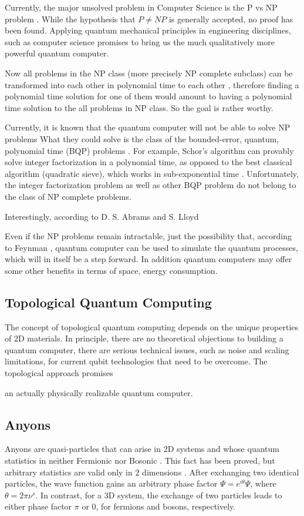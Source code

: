 Currently, the major unsolved problem in Computer Science is the P vs NP problem \cite{PvsNP}. While the hypothesis that $ P \neq NP $ is generally accepted, no proof has been found. Applying quantum mechanical principles in engineering disciplines, such as computer science \cite{FQC} promises to bring us the much qualitatively more powerful quantum computer. 

 Now all problems in the NP class (more precisely NP complete subclass) can be transformed into each other in polynomial time to each other \cite{NPComplete},  therefore finding a polynomial time solution for one of them would amount to having a polynomial time solution to the all problems in NP class. So the goal is rather worthy. 

Currently, it is known that the quantum computer will not be able to solve NP problems  What they could solve is the class of the bounded-error, quantum, polynomial time (BQP) problems \cite{BQP}. 
For example,  Schor's algorithm \cite{Schor} can provably solve integer factorization in a polynomial time, as opposed to the best classical algorithm (quadratic sieve), which works in sub-exponential time \cite{Pomerance}. Unfortunately, the integer factorization problem as well as other BQP problem do not belong to the class of NP complete problems. 

Interestingly, according to D. S. Abrams and S. Lloyd 

Even if the NP problems remain intractable, just the possibility that, according to Feynman \cite{FQC}, quantum computer can be used to simulate the quantum processes, which will in itself be a step forward. In addition quantum computers may offer some other benefits in terms of space, energy consumption. 

\subsection*{Topological Quantum Computing}
The concept of topological quantum computing \cite{Tqc1}
depends on the unique properties of 2D materials.  In principle, there are no theoretical objections to building a quantum computer, there are serious technical issues, such as noise
and scaling limitations, for current qubit technologies
that need to be overcome\cite{QCProblems}. 
The topological approach promises 

an actually physically realizable quantum computer\cite{Tqc2,Tqc3}. 


\subsection*{Anyons}
Anyons are quasi-particles that can arise in 2D systems and whose quantum statistics in neither Fermionic nor Bosonic \cite{Anyons1}.  This fact has been proved\cite{Anyons2}, but
arbitrary statistics are valid only in 2 dimensions \cite{Walsh}. After exchanging two identical particles, the wave function gains an arbitrary phase factor $ \Psi = e^{i\theta}\Psi $, where $ \theta = 2\pi\nu^{s} $. In contrast, for a 3D system, the exchange of two particles leads to either phase factor $ \pi $ or $ 0 $, for fermions and bosons, respectively.

